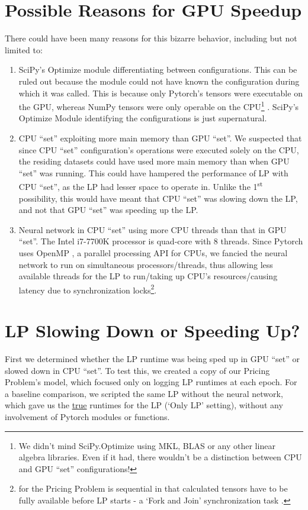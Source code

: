 \section{Possible Reasons for GPU Speedup} \label{app:Possible Reasons for GPU Speedup}
There could have been many reasons for this bizarre behavior, including but not limited to:
\begin{enumerate}
    \item SciPy's Optimize module differentiating between configurations. This can be ruled out because the module could not have known the configuration during which it was called. This is because only Pytorch's tensors were executable on the GPU, whereas NumPy tensors were only operable on the CPU\footnote{We didn't mind SciPy.Optimize using MKL, BLAS or any other linear algebra libraries. Even if it had, there wouldn't be a distinction between CPU and GPU ``set'' configurations!} \cite{PTDocs,NPDocs,SCPOptimizeDocs}. SciPy's Optimize Module identifying the configurations is just supernatural.
    \item CPU ``set'' exploiting more main memory than GPU ``set''. We suspected that since CPU ``set'' configuration's operations were executed solely on the CPU, the residing datasets could have used more main memory than when GPU ``set'' was running. This could have hampered the performance of LP with CPU ``set'', as the LP had lesser space to operate in. Unlike the 1\textsuperscript{st} possibility, this would have meant that CPU ``set'' was slowing down the LP, and not that GPU ``set'' was speeding up the LP.
    \item Neural network in CPU ``set'' using more CPU threads than that in GPU ``set''. The Intel i7-7700K processor is quad-core with 8 threads. Since Pytorch uses OpenMP \cite{PTDocs,OpenMP}, a parallel processing API for CPUs, we fancied the neural network to run on simultaneous processors/threads, thus allowing less available threads for the LP to run/taking up CPU's resources/causing latency due to synchronization locks\footnote{ for the Pricing Problem is sequential in that calculated tensors have to be fully available before LP starts - a `Fork and Join' synchronization task \cite[Section 2.2]{IssuesMP}.}.
\end{enumerate}

\section{LP Slowing Down or Speeding Up?} \label{app:LP Slowing Down or Speeding Up?}
First we determined whether the LP runtime was being sped up in GPU ``set'' or slowed down in CPU ``set''. To test this, we created a copy of our Pricing Problem's model, which focused only on logging LP runtimes at each epoch. For a baseline comparison, we scripted the same LP without the neural network, which gave us the \underline{true} runtimes for the LP (`Only LP' setting), without any involvement of Pytorch modules or functions. 

